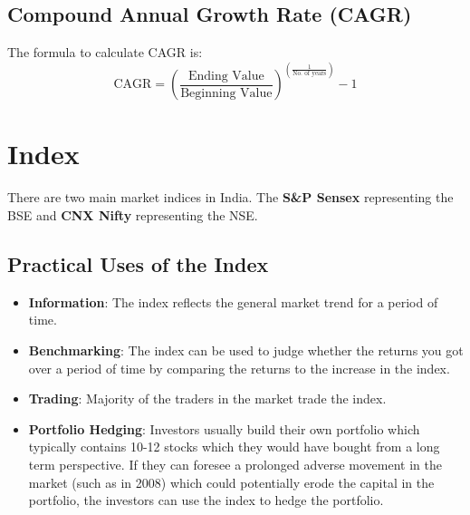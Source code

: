 \subsection{Compound Annual Growth Rate (CAGR)}
The formula to calculate CAGR is:
\begin{displaymath}
  \textrm{CAGR} = \left( \frac{\textrm{Ending Value}}{\textrm{Beginning Value}} \right)^{\left( \frac{1}{\textrm{No. of years}} \right)} - 1
\end{displaymath}


\newpage

\section{Index}
There are two main market indices in India. The \textbf{S\&P Sensex} representing the BSE and \textbf{CNX Nifty} representing the NSE.

\subsection{Practical Uses of the Index}
\begin{itemize}
  \item \textbf{Information}: The index reflects the general market trend for a period of time.
  \item \textbf{Benchmarking}: The index can be used to judge whether the returns you got over a period of time by comparing the returns to the increase in the index.
  \item \textbf{Trading}: Majority of the traders in the market trade the index.
  \item \textbf{Portfolio Hedging}: Investors usually build their own portfolio which typically contains 10-12 stocks which they would have bought from a long term perspective. If they can foresee a prolonged adverse movement in the market (such as in 2008) which could potentially erode the capital in the portfolio, the investors can use the index to hedge the portfolio.
\end{itemize}

